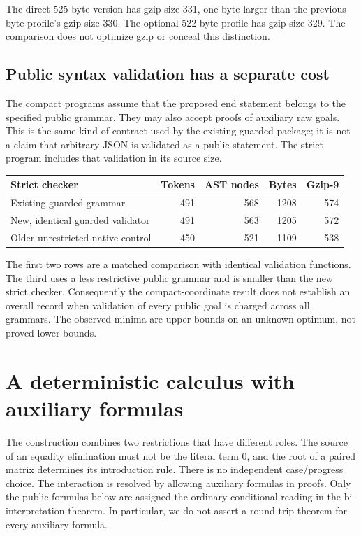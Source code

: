\documentclass[11pt,letterpaper]{article}
\theoremstyle{definition}\newtheorem{definition}[theorem]{Definition}
\theoremstyle{remark}\newtheorem{remark}[theorem]{Remark}
\begin{document}
The direct 525-byte version has gzip size 331, one byte larger than the
previous byte profile's gzip size 330. The optional 522-byte profile has
gzip size 329. The comparison does not optimize gzip or conceal this
distinction.

\subsection{Public syntax validation has a separate cost}

The compact programs assume that the proposed end statement belongs to the
specified public grammar. They may also accept proofs of auxiliary raw
goals. This is the same kind of contract used by the existing guarded
package; it is not a claim that arbitrary JSON is validated as a public
statement. The strict program includes that validation in its source size.

\begin{center}\small
\begin{tabular}{lrrrr}
\toprule
Strict checker & Tokens & AST nodes & Bytes & Gzip-9\\
\midrule
Existing guarded grammar &491&568&1208&574\\
New, identical guarded validator &491&563&1205&572\\
Older unrestricted native control &450&521&1109&538\\
\bottomrule
\end{tabular}
\end{center}
The first two rows are a matched comparison with identical validation
functions. The third uses a less restrictive public grammar and is smaller
than the new strict checker. Consequently the compact-coordinate result
does not establish an overall record when validation of every public goal
is charged across all grammars. The observed minima are upper bounds on
an unknown optimum, not proved lower bounds.


\section{A deterministic calculus with auxiliary formulas}
\label{sec:composition}

The construction combines two restrictions that have different roles.  The
source of an equality elimination must not be the literal term $0$, and the
root of a paired matrix determines its introduction rule.  There is no
independent case/progress choice.  The interaction is resolved by allowing
auxiliary formulas in proofs.  Only the public formulas below are assigned
the ordinary conditional reading in the bi-interpretation theorem.  In
particular, we do not assert a round-trip theorem for every auxiliary
formula.
\end{document}
